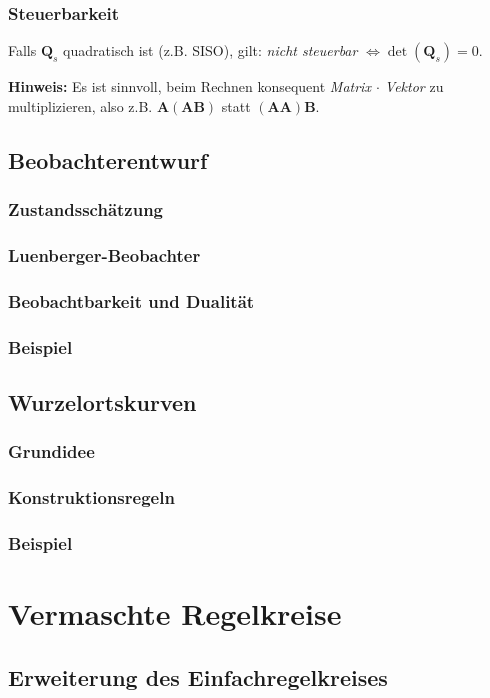 \documentclass[12pt]{article}
\begin{document}
\subsubsection{Steuerbarkeit}
\noindent Falls \(\mathbf{Q}_s\) quadratisch ist (z.B. SISO), gilt: \emph{nicht steuerbar} \(\Leftrightarrow \det(\mathbf{Q}_s)=0\).

\noindent \textbf{Hinweis:} Es ist sinnvoll, beim Rechnen konsequent \emph{Matrix $\cdot$ Vektor} zu multiplizieren, also z.B. \(\mathbf{A}(\mathbf{A}\mathbf{B})\) statt \((\mathbf{A}\mathbf{A})\mathbf{B}\).

\subsection{Beobachterentwurf}
\subsubsection{Zustandsschätzung}
\subsubsection{Luenberger-Beobachter}
\subsubsection{Beobachtbarkeit und Dualität}
\subsubsection{Beispiel}
\subsection{Wurzelortskurven}
\subsubsection{Grundidee}
\subsubsection{Konstruktionsregeln}
\subsubsection{Beispiel}
\clearpage
\section{Vermaschte Regelkreise}
\subsection{Erweiterung des Einfachregelkreises}
\end{document}
